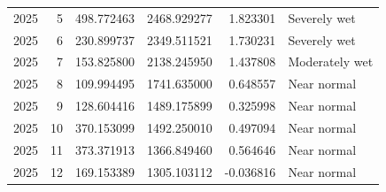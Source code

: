 \begin{tabular}{rrrrrl}
2025 & 5 & 498.772463 & 2468.929277 & 1.823301 & Severely wet \\
2025 & 6 & 230.899737 & 2349.511521 & 1.730231 & Severely wet \\
2025 & 7 & 153.825800 & 2138.245950 & 1.437808 & Moderately wet \\
2025 & 8 & 109.994495 & 1741.635000 & 0.648557 & Near normal \\
2025 & 9 & 128.604416 & 1489.175899 & 0.325998 & Near normal \\
2025 & 10 & 370.153099 & 1492.250010 & 0.497094 & Near normal \\
2025 & 11 & 373.371913 & 1366.849460 & 0.564646 & Near normal \\
2025 & 12 & 169.153389 & 1305.103112 & -0.036816 & Near normal \\
\bottomrule
\end{tabular}
